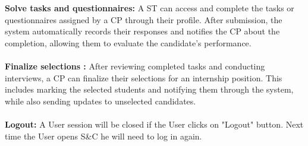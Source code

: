 \textbf{ Solve tasks and questionnaires:} A ST can access and complete the tasks or questionnaires assigned by a CP through their profile. After submission, the system automatically records their responses and notifies the CP about the completion, allowing them to evaluate the candidate's performance.\\\\
\textbf{ Finalize selections :} After reviewing completed tasks and conducting interviews, a CP can finalize their selections for an internship position. This includes marking the selected students and notifying them through the system, while also sending updates to unselected candidates.
\\\\
\textbf{ Logout:} A User session will be closed if the User clicks on "Logout" button. Next time the User opens S\&C he will need to log in again.

